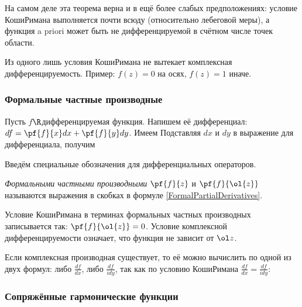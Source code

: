\documentclass[a4paper]{article}
\begin{document}
\begin{note}
На самом деле эта теорема верна и в ещё более слабых предположениях: условие Коши\ч Римана выполняется почти всюду
(относительно лебеговой меры), а функция a priori может быть не дифференцируемой в счётном числе точек области.
\end{note}

\begin{note}
Из одного лишь условия Коши\ч Римана не вытекает комплексная дифференцируемость.
Пример: $f(z)=0$ на осях, $f(z)=1$ иначе.
\end{note}

\subsubsection{Формальные частные производные}

Пусть $f$\т $\R$\д дифференцируемая функция. Напишем её дифференциал: $df = \pf{f}{x}dx + \pf{f}{y}dy$.
Имеем
Подставляя $dx$ и $dy$ в выражение для дифференциала, получим

Введём специальные обозначения для дифференциальных операторов.

\begin{df}
\emph{Формальными частными производными} $\pf{f}{z}$ и $\pf{f}{\ol{z}}$ называются выражения в
скобках в формуле \eqref{FormalPartialDerivatives}.
\end{df}

Условие Коши\ч Римана в терминах формальных частных производных записывается так: $\pf{f}{\ol{z}} = 0$.
Условие комплексной дифференцируемости означает, что функция не зависит от $\ol z$.

Если комплексная производная существует, то её можно вычислить по одной из двух формул: либо $\frac{df}{dx}$,
либо $\frac{df}{idy}$, так как по условию Коши\ч Римана $\frac{df}{dx} = \frac{df}{idy}$:

\subsubsection{Сопряжённые гармонические функции}
\end{document}
